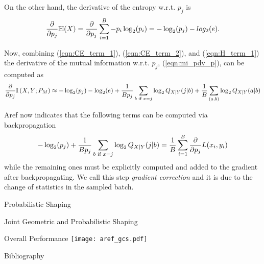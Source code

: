 \documentclass[english,aspectratio=1610,9pt,helvet,nicetitles]{ICEbeamerTUMCD}
\begin{document}
	\begin{frame}
	
	On the other hand, the derivative of the entropy w.r.t. $p_j$ is
	\begin{align}
	\label{eqn:H_term_1}
		\pdv{p_j} \mathbb{H}(X) = \pdv{p_j} \sum \limits_{i = 1}^{B} - p_i \log_2(p_i) = - \log_2 (p_j) - log_2 (e).
	\end{align}
	
	Now, combining (\ref{eqn:CE_term_1}), (\ref{eqn:CE_term_2}), and (\ref{eqn:H_term_1}) the derivative of the mutual information w.r.t. $p_j$, (\ref{eqn:mi_pdv_p}), can be computed as
	\begin{align}
		\pdv{p_j} \mathbb{I} \left(X , Y ; P_M \right) \approx - \log_2 (p_j) - \log_2 (e) + \dfrac{1}{Bp_j}\sum \limits_{b \text{ if } x=j} \log_2 Q_{X|Y}(j|b) + \dfrac{1}{B} \sum \limits_{(a,b)} \log_2 Q_{X|Y}(a|b)
	\end{align}
	
	Aref now indicates that the following terms can be computed via backpropagation
	\begin{align}
		- \log_2 (p_j) + \dfrac{1}{Bp_j}\sum \limits_{b \text{ if } x=j} \log_2 Q_{X|Y}(j|b) = \dfrac{1}{B} \sum \limits_{i = 1}^{B} \pdv{p_j} L(x_i, y_i)
	\end{align}
	while the remaining ones must be explicitly computed and added to the gradient after backpropagating. We call this step \textit{gradient correction} and it is due to the change of statistics in the sampled batch.
	
\end{frame}
	

\begin{frame}{Probabilistic Shaping}
	

\end{frame}

\begin{frame}{Joint Geometric and Probabilistic Shaping}
	
\end{frame}

\begin{frame}{Overall Performance}
	\centering
	\texttt{[image: aref\_gcs.pdf]}
	\label{fig:arefPerf}

\end{frame}

\begin{frame}{Bibliography}
\printbibliography[heading=none]
\end{frame}

\end{document}
